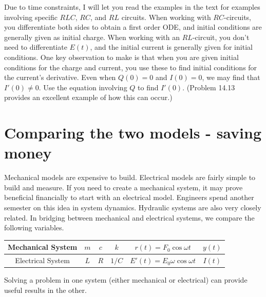 Due to time constraints, I will let you read the examples in the text for examples involving specific $RLC$, $RC$, and $RL$ circuits. When working with $RC$-circuits, you differentiate both sides to obtain a first order ODE, and initial conditions are generally given as initial charge.  When working with an $RL$-circuit, you don't need to differentiate $E(t)$, and the initial current is generally given for initial conditions. One key observation to make is that when you are given initial conditions for the charge and current, you use these to find initial conditions for the current's derivative. Even when $Q(0)=0$ and $I(0)=0$, we may find that $I'(0)\neq 0$. Use the equation involving $Q$ to find $I'(0)$. (Problem 14.13 provides an excellent example of how this can occur.) 

\section{Comparing the two models - saving money}

Mechanical models are expensive to build.  Electrical models are fairly simple to build and measure.  If you need to create a mechanical system, it may prove beneficial financially to start with an electrical model. Engineers spend another semester on this idea in system dynamics.  Hydraulic systems are also very closely related. In bridging between mechanical and electrical systems, we compare the following variables. 

\begin{center}
\begin{tabular}{|c|c|c|c|c|c|}
\hline
Mechanical System&$m$&$c$&$k$&$r(t)=F_0\cos\omega t$&$y(t)$\\\hline
Electrical System&$L$&$R$&$1/C$&$E'(t) = E_0\omega\cos\omega t$&$I(t)$\\
\hline
\end{tabular}
\end{center}

Solving a problem in one system (either mechanical or electrical) can provide useful results in the other.  

